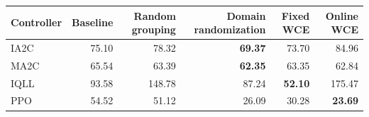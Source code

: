 \begin{tabular}{lrrrrr}
\hline
Controller & Baseline & Random grouping & Domain randomization & Fixed WCE & Online WCE \\
\hline
IA2C & 75.10 & 78.32 & \textbf{69.37} & 73.70 & 84.96 \\
MA2C & 65.54 & 63.39 & \textbf{62.35} & 63.35 & 62.84 \\
IQLL & 93.58 & 148.78 & 87.24 & \textbf{52.10} & 175.47 \\
PPO & 54.52 & 51.12 & 26.09 & 30.28 & \textbf{23.69} \\
\hline
\end{tabular}
